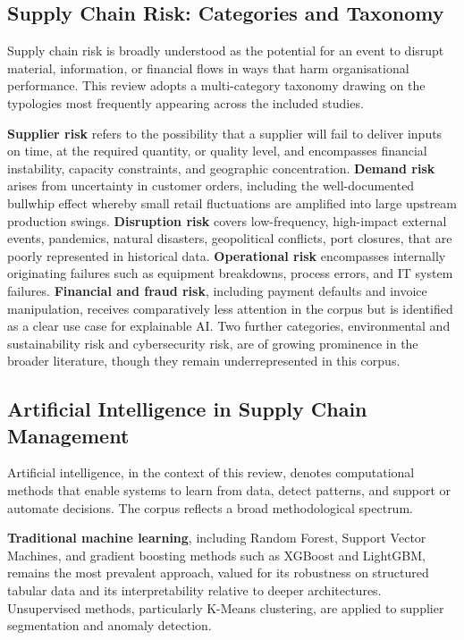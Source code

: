 \subsection{Supply Chain Risk: Categories and Taxonomy}
 
Supply chain risk is broadly understood as the potential for an event to
disrupt material, information, or financial flows in ways that harm
organisational performance. This review adopts a multi-category taxonomy
drawing on the typologies most frequently appearing across the included
studies.
 
\textbf{Supplier risk} refers to the possibility that a supplier will fail to
deliver inputs on time, at the required quantity, or quality level, and
encompasses financial instability, capacity constraints, and geographic
concentration. \textbf{Demand risk} arises from uncertainty in customer
orders, including the well-documented bullwhip effect whereby small retail
fluctuations are amplified into large upstream production swings.
\textbf{Disruption risk} covers low-frequency, high-impact external events,
pandemics, natural disasters, geopolitical conflicts, port closures, that
are poorly represented in historical data. \textbf{Operational risk}
encompasses internally originating failures such as equipment breakdowns,
process errors, and IT system failures. \textbf{Financial and fraud risk},
including payment defaults and invoice manipulation, receives comparatively
less attention in the corpus but is identified as a clear use case for
explainable AI. Two further categories, environmental and sustainability
risk and cybersecurity risk, are of growing prominence in the broader
literature, though they remain underrepresented in this corpus.
 
\subsection{Artificial Intelligence in Supply Chain Management}
 
Artificial intelligence, in the context of this review, denotes computational
methods that enable systems to learn from data, detect patterns, and support
or automate decisions. The corpus reflects a broad methodological spectrum.
 
\textbf{Traditional machine learning}, including Random Forest, Support
Vector Machines, and gradient boosting methods such as XGBoost and
LightGBM, remains the most prevalent approach, valued for its robustness on
structured tabular data and its interpretability relative to deeper
architectures. Unsupervised methods, particularly K-Means clustering, are
applied to supplier segmentation and anomaly detection.
 
